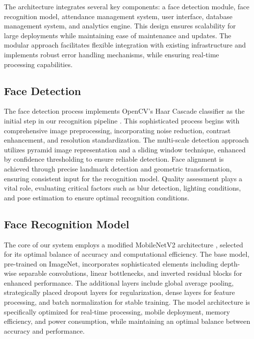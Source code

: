\documentclass[conference]{IEEEtran}
\begin{document}
The architecture integrates several key components: a face detection module, face recognition model, attendance management system, user interface, database management system, and analytics engine. This design ensures scalability for large deployments while maintaining ease of maintenance and updates. The modular approach facilitates flexible integration with existing infrastructure and implements robust error handling mechanisms, while ensuring real-time processing capabilities.

\subsection{Face Detection}
The face detection process implements OpenCV's Haar Cascade classifier as the initial step in our recognition pipeline \cite{b2}. This sophisticated process begins with comprehensive image preprocessing, incorporating noise reduction, contrast enhancement, and resolution standardization. The multi-scale detection approach utilizes pyramid image representation and a sliding window technique, enhanced by confidence thresholding to ensure reliable detection. Face alignment is achieved through precise landmark detection and geometric transformation, ensuring consistent input for the recognition model. Quality assessment plays a vital role, evaluating critical factors such as blur detection, lighting conditions, and pose estimation to ensure optimal recognition conditions.

\subsection{Face Recognition Model}
The core of our system employs a modified MobileNetV2 architecture \cite{b8}, selected for its optimal balance of accuracy and computational efficiency. The base model, pre-trained on ImageNet, incorporates sophisticated elements including depth-wise separable convolutions, linear bottlenecks, and inverted residual blocks for enhanced performance. The additional layers include global average pooling, strategically placed dropout layers for regularization, dense layers for feature processing, and batch normalization for stable training. The model architecture is specifically optimized for real-time processing, mobile deployment, memory efficiency, and power consumption, while maintaining an optimal balance between accuracy and performance.
\end{document}

